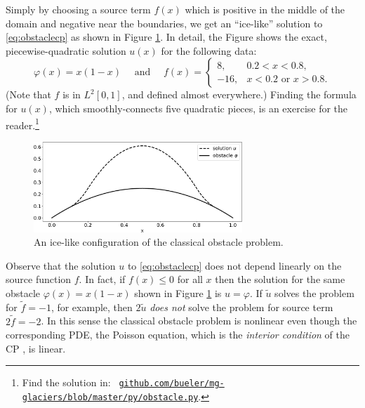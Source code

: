 \documentclass[letterpaper,final,12pt,reqno]{amsart}
\theoremstyle{claim}
\numberwithin{equation}{section}
\numberwithin{figure}{section}
\numberwithin{table}{section}
\begin{document}
Simply by choosing a source term $f(x)$ which is positive in the middle of the domain and negative near the boundaries, we get an ``ice-like'' solution to \eqref{eq:obstaclecp} as shown in Figure \ref{fig:icelike}.  In detail, the Figure shows the exact, piecewise-quadratic solution $u(x)$ for the following data:
\begin{equation}
\varphi(x) = x(1-x) \quad \text{ and } \quad f(x) = \begin{cases} 8, & 0.2 < x < 0.8, \\
                                                               -16, & x<0.2 \text{ or } x>0.8. \end{cases}  \label{eq:icelikedetails}
\end{equation}
(Note that $f$ is in $L^2[0,1]$, and defined almost everywhere.)  Finding the formula for $u(x)$, which smoothly-connects five quadratic pieces, is an exercise for the reader.\footnote{Find the solution in: \, \href{https://github.com/bueler/mg-glaciers/blob/master/py/obstacle.py}{\texttt{github.com/bueler/mg-glaciers/blob/master/py/obstacle.py}}.}

\begin{figure}
\includegraphics[width=0.7\textwidth]{fixfigs/icelike.pdf}
\caption{An ice-like configuration of the classical obstacle problem.}
\label{fig:icelike}
\end{figure}

Observe that the solution $u$ to \eqref{eq:obstaclecp} does not depend linearly on the source function $f$.  In fact, if $f(x)\le 0$ for all $x$ then the solution for the same obstacle $\varphi(x)=x(1-x)$ shown in Figure \ref{fig:icelike} is $u=\varphi$.  If $\tilde u$ solves the problem for $\tilde f= -1$, for example, then $2\tilde u$ \emph{does not} solve the problem for source term $2\tilde f = -2$.  In this sense the classical obstacle problem is nonlinear even though the corresponding PDE, the Poisson equation, which is the \emph{interior condition} of the CP \cite{KinderlehrerStampacchia1980}, is linear.
\end{document}
